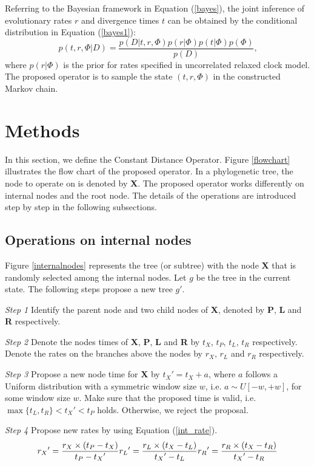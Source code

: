 \documentclass{bmcart}
\begin{document}
Referring to the Bayesian framework in Equation (\ref{bayes}), the joint inference of evolutionary rates $r$ and divergence times $t$ can be obtained by the conditional distribution in Equation (\ref{bayes1}):
\begin{equation}\label{bayes1}
p(t,r,\Phi |D) = \frac{{p(D|t,r,\Phi )p(r|\Phi )p(t|\Phi )p(\Phi )}}{{p(D)}} \text{,}
\end{equation}
where $p(r|\Phi )$ is the prior for rates specified in uncorrelated relaxed clock model. The proposed operator is to sample the state $(t,r,\Phi)$ in the constructed Markov chain.

\section*{Methods}
In this section, we define the Constant Distance Operator. Figure \ref{flowchart} illustrates the flow chart of the proposed operator. In a phylogenetic tree, the node to operate on is denoted by \textbf{X}. The proposed operator works differently on internal nodes and the root node. The details of the operations are introduced step by step in the following subsections.
\subsection*{Operations on internal nodes}
Figure \ref{internalnodes} represents the tree (or subtree) with the node \textbf{X} that is randomly selected among the internal nodes.  Let $g$ be the tree in the current state. The following steps propose a new tree ${g}'$.

\emph{Step 1} Identify the parent node and two child nodes of \textbf{X}, denoted by \textbf{P}, \textbf{L} and \textbf{R} respectively.

\emph{Step 2} Denote the nodes times of \textbf{X}, \textbf{P}, \textbf{L} and \textbf{R} by $t_X$, $t_P$, $t_L$, $t_R$ respectively. Denote the rates on the branches above the nodes by $r_X$, $r_L$ and $r_R$ respectively.

\emph{Step 3} Propose a new node time for \textbf{X} by ${t_X}' = {t_X} + a$, where $a$ follows a Uniform distribution with a symmetric window size $w$, i.e. $a \sim U[ - w, + w]$, for some window size $w$. Make sure that the proposed time is valid, i.e. $\max \{ {t_L},{t_R}\}  < {t_X}' < {t_P}$ holds. Otherwise, we reject the proposal.

\emph{Step 4} Propose new rates by using Equation (\ref{int_rate}).
\begin{equation}
 \label{int_rate}
{r_X}' = \frac{{r_X} \times ({{t_P} - {t_X}})}{{{t_P} - {t_X}'}}\\
{r_L}' = \frac{{{r_L} \times ({{t_X} - {t_L}})}}{{{t_X}' - {t_L}}}\\
{r_R}' = \frac{{{r_R} \times ({{t_X} - {t_R}})}}{{{t_X}' - {t_R}}}
 \end{equation}
\end{document}
